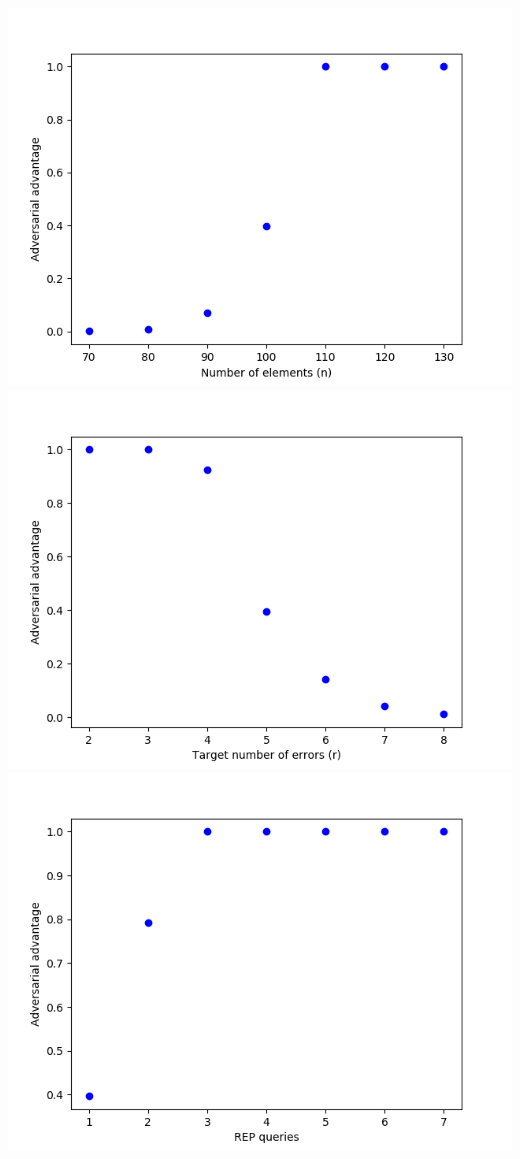 \includegraphics[scale=0.5]{Figure_3}
\includegraphics[scale=0.5]{Figure_4}
\includegraphics[scale=0.5]{Figure_5}
